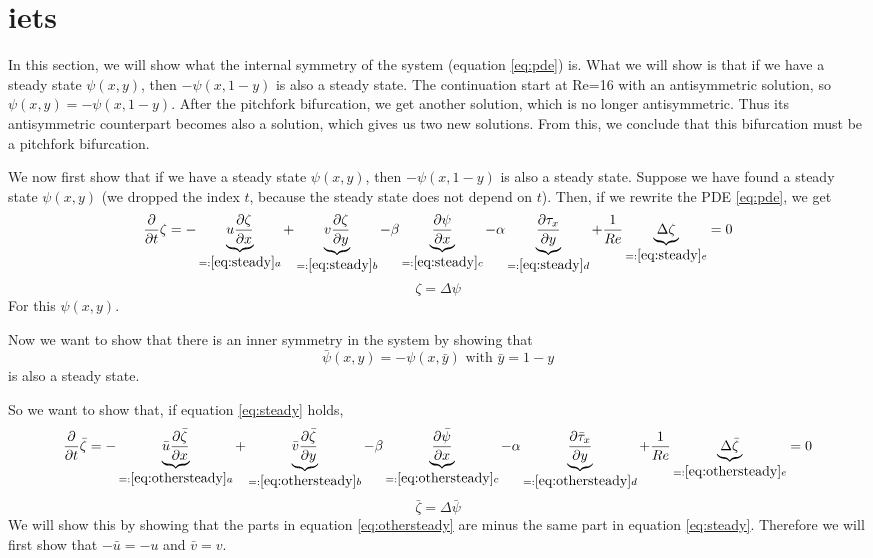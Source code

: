 \section{iets}
In this section, we will show what the internal symmetry of the system (equation \ref{eq:pde}) is. What we will show is that if we have a steady state $\psi(x,y)$, then $-\psi(x,1-y)$ is also a steady state. The continuation start at Re=16 with an antisymmetric solution, so $\psi(x,y)=-\psi(x,1-y)$. After the pitchfork bifurcation, we get another solution, which is no longer antisymmetric. Thus its antisymmetric counterpart becomes also a solution, which gives us two new solutions. From this, we conclude that this bifurcation must be a pitchfork bifurcation.
 
 We now first show that if we have a steady state $\psi(x,y)$, then $-\psi(x,1-y)$ is also a steady state.
Suppose we have found a steady state $\psi(x,y)$ (we dropped the index $t$, because the steady state does not depend on $t$). Then, if we rewrite the PDE \ref{eq:pde}, we get
 \begin{equation}
   \frac{\partial}{\partial t}\zeta= - \underbrace{   u \frac{\partial\zeta}{\partial x}}_{=:\ref{eq:steady} a} +\underbrace{  v \frac{\partial\zeta}{\partial y}}_{=:\ref{eq:steady}b} - \beta \underbrace{\frac{\partial \psi}{\partial x} }_{=:\ref{eq:steady}c} - \alpha\underbrace{ \frac{\partial \tau_x}{\partial y}}_{=:\ref{eq:steady} d} +\frac{1}{Re}  \underbrace{\Delta \zeta}_{=:\ref{eq:steady}e}=0\label{eq:steady}
\end{equation}
 $$\zeta=\Delta \psi $$
For this $\psi(x,y)$.

Now we want to show that there is an inner symmetry in the system by showing that
$$\bar{\psi}(x,y)=-\psi(x,\bar{y}) \text{ with }\bar{y}=1-y$$
is also a steady state.

So we want to show that, if equation \ref{eq:steady} holds, 
 \begin{equation} \frac{\partial}{\partial t}\bar{\zeta}=- \underbrace{  \bar u \frac{\partial\bar{\zeta}}{\partial x}}_{=:\ref{eq:othersteady} a} +\underbrace{ \bar v \frac{\partial\bar{\zeta}}{\partial y}}_{=:\ref{eq:othersteady}b} -\beta \underbrace{ \frac{\partial \bar{\psi}}{\partial x} }_{=:\ref{eq:othersteady}c} -\alpha  \underbrace{\frac{\partial \bar \tau_x}{\partial y}}_{=:\ref{eq:othersteady}d} + \frac{1}{Re} \underbrace{\Delta \bar{\zeta}}_{=:\ref{eq:othersteady}e}=0 \label{eq:othersteady}
 \end{equation}
 $$\bar{\zeta}=\Delta \bar{\psi}$$ 
We will show this by showing that the parts in equation \ref{eq:othersteady} are minus the same part in equation \ref{eq:steady}. Therefore we will first show that $-\bar{u}=-u$ and $\bar{v}=v$. 
 
